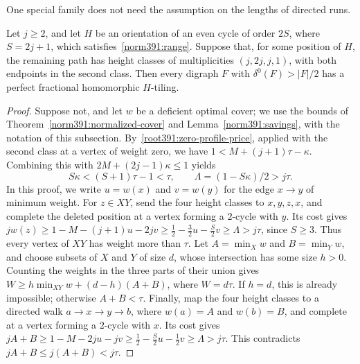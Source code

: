 One special family does not need the assumption on the lengths of directed runs.

\begin{lemma}
\label{singleouter:balanced}
Let $j\ge2$, and let $H$ be an orientation of an even cycle of order $2S$, where $S=2j+1$, which satisfies~\eqref{norm391:range}. Suppose that, for some position of $H$, the remaining path has height classes of multiplicities $(j,2j,j,1)$, with both endpoints in the second class. Then every digraph $F$ with $\delta^0(F)>|F|/2$ has a perfect fractional homomorphic $H$-tiling.
\end{lemma}
\begin{proof}
Suppose not, and let $w$ be a deficient optimal cover; we use the bounds of Theorem~\ref{norm391:normalized-cover} and Lemma~\ref{norm391:savings}, with the notation of this subsection. By~\eqref{root391:zero-profile-price}, applied with the second class at a vertex of weight zero, we have $1<M+(j+1)\tau-\kappa$. Combining this with
$2M+(2j-1)\kappa\le1$ yields
\[
 S\kappa<(S+1)\tau-1<\tau,
 \qquad \Lambda=(1-S\kappa)/2>j\tau.
\]
In this proof, we write $u=w(x)$ and $v=w(y)$ for the edge $x\to y$ of minimum weight. For $z\in XY$, send the
four height classes to $x,y,z,x$, and complete the deleted position
at a vertex forming a $2$-cycle with $y$. Its cost gives $jw(z)\ge1-M-(j+1)u-2jv \ge\tfrac12-\tfrac32u-\tfrac S2v \ge\Lambda>j\tau$, since $S\ge3$. Thus every vertex of $XY$ has weight
more than $\tau$. Let $A=\min_Xw$ and $B=\min_Yw$, and choose
subsets of $X$ and $Y$ of size $d$, whose intersection has some size $h>0$.
Counting the weights in the three parts of their union gives
$W\ge h\min_{XY}w+(d-h)(A+B)$, where $W=d\tau$.
If $h=d$, this is already impossible; otherwise $A+B<\tau$.
Finally, map the four height classes to a directed walk
$a\to x\to y\to b$, where $w(a)=A$ and $w(b)=B$, and complete
at a vertex forming a $2$-cycle with $x$. Its cost gives $jA+B\ge1-M-2ju-jv \ge\tfrac12-\tfrac S2u-\tfrac12v \ge\Lambda>j\tau$. This contradicts $jA+B\le j(A+B)<j\tau$.
\end{proof}
